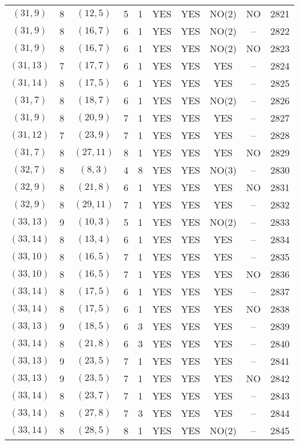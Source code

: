 \begin{longtable}{|c|c|c|c|c|c|c|c|c|c|}
$(31, 9)$ & 8 & $(12, 5)$ & 5 & 1 & YES & YES & NO(2) & NO & 2821\\
$(31, 9)$ & 8 & $(16, 7)$ & 6 & 1 & YES & YES & NO(2) & -- & 2822\\
$(31, 9)$ & 8 & $(16, 7)$ & 6 & 1 & YES & YES & NO(2) & NO & 2823\\
$(31, 13)$ & 7 & $(17, 7)$ & 6 & 1 & YES & YES & YES & -- & 2824\\
$(31, 14)$ & 8 & $(17, 5)$ & 6 & 1 & YES & YES & YES & -- & 2825\\
$(31, 7)$ & 8 & $(18, 7)$ & 6 & 1 & YES & YES & NO(2) & -- & 2826\\
$(31, 9)$ & 8 & $(20, 9)$ & 7 & 1 & YES & YES & YES & -- & 2827\\
$(31, 12)$ & 7 & $(23, 9)$ & 7 & 1 & YES & YES & YES & -- & 2828\\
$(31, 7)$ & 8 & $(27, 11)$ & 8 & 1 & YES & YES & YES & NO & 2829\\
$(32, 7)$ & 8 & $(8, 3)$ & 4 & 8 & YES & YES & NO(3) & -- & 2830\\
$(32, 9)$ & 8 & $(21, 8)$ & 6 & 1 & YES & YES & YES & NO & 2831\\
$(32, 9)$ & 8 & $(29, 11)$ & 7 & 1 & YES & YES & YES & -- & 2832\\
$(33, 13)$ & 9 & $(10, 3)$ & 5 & 1 & YES & YES & NO(2) & -- & 2833\\
$(33, 14)$ & 8 & $(13, 4)$ & 6 & 1 & YES & YES & YES & -- & 2834\\
$(33, 10)$ & 8 & $(16, 5)$ & 7 & 1 & YES & YES & YES & -- & 2835\\
$(33, 10)$ & 8 & $(16, 5)$ & 7 & 1 & YES & YES & YES & NO & 2836\\
$(33, 14)$ & 8 & $(17, 5)$ & 6 & 1 & YES & YES & YES & -- & 2837\\
$(33, 14)$ & 8 & $(17, 5)$ & 6 & 1 & YES & YES & YES & NO & 2838\\
$(33, 13)$ & 9 & $(18, 5)$ & 6 & 3 & YES & YES & YES & -- & 2839\\
$(33, 14)$ & 8 & $(21, 8)$ & 6 & 3 & YES & YES & YES & -- & 2840\\
$(33, 13)$ & 9 & $(23, 5)$ & 7 & 1 & YES & YES & YES & -- & 2841\\
$(33, 13)$ & 9 & $(23, 5)$ & 7 & 1 & YES & YES & YES & NO & 2842\\
$(33, 14)$ & 8 & $(23, 7)$ & 7 & 1 & YES & YES & YES & -- & 2843\\
$(33, 14)$ & 8 & $(27, 8)$ & 7 & 3 & YES & YES & YES & -- & 2844\\
$(33, 14)$ & 8 & $(28, 5)$ & 8 & 1 & YES & YES & NO(2) & -- & 2845\\

\end{longtable}
